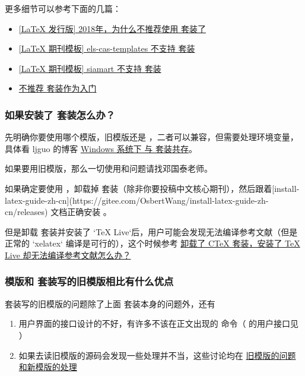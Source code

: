 更多细节可以参考下面的几篇：

\begin{itemize}
  \item \href{https://zhuanlan.zhihu.com/p/45174503}{[LaTeX 发行版] 2018年，为什么不推荐使用 \CTeX 套装了}
  \item \href{https://zhuanlan.zhihu.com/p/73304856}{[LaTeX 期刊模板] els-cas-templates 不支持 \CTeX 套装}
  \item \href{https://zhuanlan.zhihu.com/p/112637535}{[LaTeX 期刊模板] siamart 不支持 \CTeX 套装}
  \item \href{https://tieba.baidu.com/p/2665622350}{不推荐 \CTeX 套装作为入门}
\end{itemize}


\subsubsection{如果安装了 \CTeX 套装怎么办？}

先明确你要使用哪个模版，旧模版还是 ，二者可以兼容，但需要处理环境变量，具体看 ljguo 的博客 \href{https://ljguo1020.github.io/2022/06/09/texlive-and-ctex/}{Windows 系统下 \TeXLive 与 \CTeX 套装共存}。

如果要用旧模版，那么一切使用和问题请找邓国泰老师。

如果确定要使用 ，卸载掉 \CTeX 套装（除非你要投稿中文核心期刊），然后跟着[install-latex-guide-zh-cn](https://gitee.com/OsbertWang/install-latex-guide-zh-cn/releases) 文档正确安装 \TeXLive 。


但是卸载 \CTeX 套装并安装了 `TeX Live`后，用户可能会发现无法编译参考文献（但是正常的 `xelatex` 编译是可行的），这个时候参考
\href{https://gitee.com/xkwxdyy/CCNUthesis/wikis/%E5%8D%B8%E8%BD%BD%E4%BA%86CTeX%E5%A5%97%E8%A3%85%E5%AE%89%E8%A3%85%E4%BA%86TeXLive%E5%8D%B4%E6%97%A0%E6%B3%95%E7%BC%96%E8%AF%91%E5%8F%82%E8%80%83%E6%96%87%E7%8C%AE}{卸载了 CTeX 套装，安装了 TeX Live 却无法编译参考文献怎么办？}


\subsubsection{ 模版和 \CTeX 套装写的旧模版相比有什么优点}

\CTeX 套装写的旧模版的问题除了上面 \CTeX 套装本身的问题外，还有
\begin{enumerate}
  \item 用户界面的接口设计的不好，有许多不该在正文出现的  命令（ 的用户接口见 ）
  \item 如果去读旧模版的源码会发现一些处理并不当，这些讨论均在 \href{https://gitee.com/xkwxdyy/CCNUthesis/wikis/%E6%97%A7%E6%A8%A1%E7%89%88%E7%9A%84%E9%97%AE%E9%A2%98%E5%92%8C%E6%96%B0%E6%A8%A1%E7%89%88%E7%9A%84%E5%A4%84%E7%90%86}{旧模版的问题和新模版的处理}
\end{enumerate}

